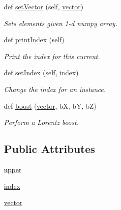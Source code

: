 \begin{DoxyCompactItemize}
def \hyperlink{class_py_spinor_1_1_lorentz_vector_1_1_lorentz_vector_acf1bb09347d6e573c95e8e4c1c9d99c6}{set\+Vector} (self, \hyperlink{class_py_spinor_1_1_lorentz_vector_1_1_lorentz_vector_a094448bd25db3631dfda6402c7c258e1}{vector})
\begin{DoxyCompactList}\small\item\em Sets elements given 1-\/d numpy array. \end{DoxyCompactList}\item 
def \hyperlink{class_py_spinor_1_1_lorentz_vector_1_1_lorentz_vector_aa37cd941a7f2cbd8369f0a5e28925576}{print\+Index} (self)
\begin{DoxyCompactList}\small\item\em Print the index for this current. \end{DoxyCompactList}\item 
def \hyperlink{class_py_spinor_1_1_lorentz_vector_1_1_lorentz_vector_ae739123740bfd3809dd9b885afad90eb}{set\+Index} (self, \hyperlink{class_py_spinor_1_1_lorentz_vector_1_1_lorentz_vector_a11da34cf107e38100b3bfb509eac2d1f}{index})
\begin{DoxyCompactList}\small\item\em Change the index for an instance. \end{DoxyCompactList}\item 
def \hyperlink{class_py_spinor_1_1_lorentz_vector_1_1_lorentz_vector_a5a7c97faead7b3e7f08885b4ebb1f24d}{boost} (\hyperlink{class_py_spinor_1_1_lorentz_vector_1_1_lorentz_vector_a094448bd25db3631dfda6402c7c258e1}{vector}, b\+X, b\+Y, b\+Z)
\begin{DoxyCompactList}\small\item\em Perform a Lorentz boost. \end{DoxyCompactList}\end{DoxyCompactItemize}
\subsection*{Public Attributes}
\begin{DoxyCompactItemize}
\item 
\hyperlink{class_py_spinor_1_1_lorentz_vector_1_1_lorentz_vector_ad789506f2bd56ab54bb743d84092aa77}{upper}
\item 
\hyperlink{class_py_spinor_1_1_lorentz_vector_1_1_lorentz_vector_a11da34cf107e38100b3bfb509eac2d1f}{index}
\item 
\hyperlink{class_py_spinor_1_1_lorentz_vector_1_1_lorentz_vector_a094448bd25db3631dfda6402c7c258e1}{vector}
\end{DoxyCompactItemize}


